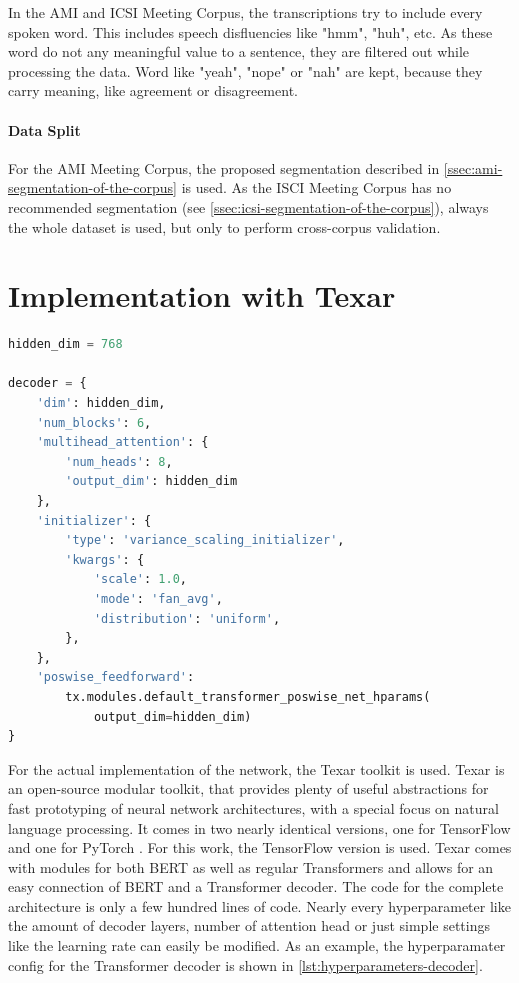 In the AMI and ICSI Meeting Corpus, the transcriptions try to include every spoken word.
This includes speech disfluencies like "hmm", "huh", etc.
As these word do not any meaningful value to a sentence, they are filtered out while processing the data.
Word like "yeah", "nope" or "nah" are kept, because they carry meaning, like agreement or disagreement. 

\paragraph{Data Split}

For the AMI Meeting Corpus, the proposed segmentation described in \cref{ssec:ami-segmentation-of-the-corpus} is used.
As the ISCI Meeting Corpus has no recommended segmentation (see \cref{ssec:icsi-segmentation-of-the-corpus}), always the whole dataset is used, but only to perform cross-corpus validation.


\section{Implementation with Texar}

\begin{lstlisting}[numbers=none,language=Python,caption={Hyperparameters for Transformer decoder},captionpos=b,label=lst:hyperparameters-decoder]
hidden_dim = 768

decoder = {
    'dim': hidden_dim,
    'num_blocks': 6,
    'multihead_attention': {
        'num_heads': 8,
        'output_dim': hidden_dim
    },
    'initializer': {
        'type': 'variance_scaling_initializer',
        'kwargs': {
            'scale': 1.0,
            'mode': 'fan_avg',
            'distribution': 'uniform',
        },
    },
    'poswise_feedforward': 
        tx.modules.default_transformer_poswise_net_hparams(
            output_dim=hidden_dim)
}
\end{lstlisting}

For the actual implementation of the network, the Texar toolkit \cite{hu2019texar} is used.
Texar is an open-source modular toolkit, that provides plenty of useful abstractions for fast prototyping of neural network architectures, with a special focus on natural language processing.
It comes in two nearly identical versions, one for TensorFlow \cite{tensorflow2015-whitepaper} and one for PyTorch \cite{NEURIPS2019_9015}.  
For this work, the TensorFlow version is used.
Texar comes with modules for both BERT as well as regular Transformers and allows for an easy connection of BERT and a Transformer decoder.
The code for the complete architecture is only a few hundred lines of code.
Nearly every hyperparameter like the amount of decoder layers, number of attention head or just simple settings like the learning rate can easily be modified.
As an example, the hyperparamater config for the Transformer decoder is shown in \cref{lst:hyperparameters-decoder}.

